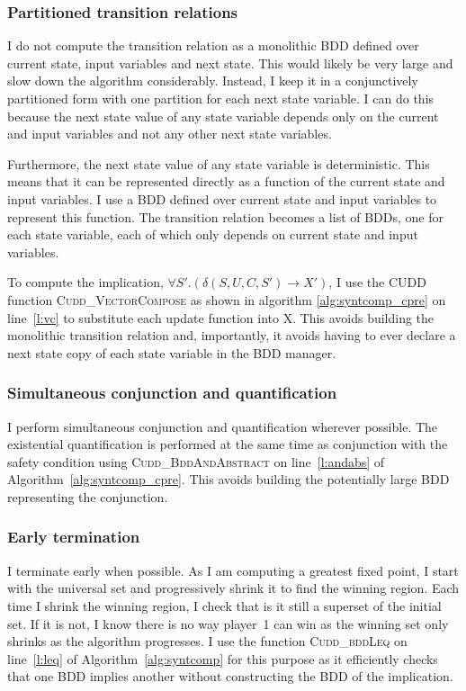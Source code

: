 \subsubsection{Partitioned transition relations}
I do not compute the transition relation as a monolithic BDD defined over current state, input variables and next state. This would likely be very large and slow down the algorithm considerably. Instead, I keep it in a conjunctively partitioned form with one partition for each next state variable. I can do this because the next state value of any state variable depends only on the current and input variables and not any other next state variables.

Furthermore, the next state value of any state variable is deterministic. This means that it can be represented directly as a function of the current state and input variables. I use a BDD defined over current state and input variables to represent this function. The transition relation becomes a list of BDDs, one for each state variable, each of which only depends on current state and input variables. 

To compute the implication, $\forall S'. (\delta(S, U, C, S') \rightarrow X')$, I use the CUDD function \textsc{Cudd\_VectorCompose} as shown in algorithm \ref{alg:syntcomp_cpre} on line~\ref{l:vc} to substitute each update function into X. This avoids building the monolithic transition relation and, importantly, it avoids having to ever declare a next state copy of each state variable in the BDD manager. 

\subsubsection{Simultaneous conjunction and quantification}
I perform simultaneous conjunction and quantification wherever possible. The existential quantification is performed at the same time as conjunction with the safety condition using \textsc{Cudd\_BddAndAbstract} on line~\ref{l:andabs} of Algorithm~\ref{alg:syntcomp_cpre}. This avoids building the potentially large BDD representing the conjunction.

\subsubsection{Early termination}
I terminate early when possible. As I am computing a greatest fixed point, I start with the universal set and progressively shrink it to find the winning region. Each time I shrink the winning region, I check that is it still a superset of the initial set. If it is not, I know there is no way player~1 can win as the winning set only shrinks as the algorithm progresses. I use the function \textsc{Cudd\_bddLeq} on line~\ref{l:leq} of Algorithm~\ref{alg:syntcomp} for this purpose as it efficiently checks that one BDD implies another without constructing the BDD of the implication.


